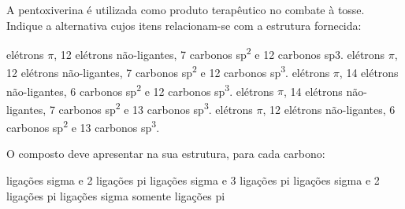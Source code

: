 \documentclass[10pt]{scrartcl}
\begin{document}
\begin{exercise}[points=1]
A pentoxiverina é utilizada como produto terapêutico no combate à tosse. Indique a alternativa cujos itens relacionam-se com a estrutura fornecida:

{\centering 
{}
}
\begin{choice}
 elétrons \(\pi\), 12 elétrons não-ligantes, 7 carbonos
sp\textsuperscript{2} e 12 carbonos sp3.
 elétrons \(\pi\), 12 elétrons não-ligantes, 7 carbonos
sp\textsuperscript{2} e 12 carbonos sp\textsuperscript{3}.
 elétrons \(\pi\), 14 elétrons não-ligantes, 6 carbonos
sp\textsuperscript{2} e 12 carbonos sp\textsuperscript{3}.
 elétrons \(\pi\), 14 elétrons não-ligantes, 7 carbonos
sp\textsuperscript{2} e 13 carbonos sp\textsuperscript{3}.
 elétrons \(\pi\), 12 elétrons não-ligantes, 6 carbonos
sp\textsuperscript{2} e 13 carbonos sp\textsuperscript{3}.
\end{choice}
\end{exercise}
\begin{solution}

\end{solution}






\begin{exercise}[points=1]
O composto   deve apresentar na
sua estrutura, para cada carbono:

\begin{choice}
 ligações sigma e 2 ligações pi
 ligações sigma e 3 ligações pi
 ligações sigma e 2 ligações pi
 ligações sigma
\choice somente ligações pi
\end{choice}
\end{exercise}
\begin{solution}

\end{solution}
\end{document}
